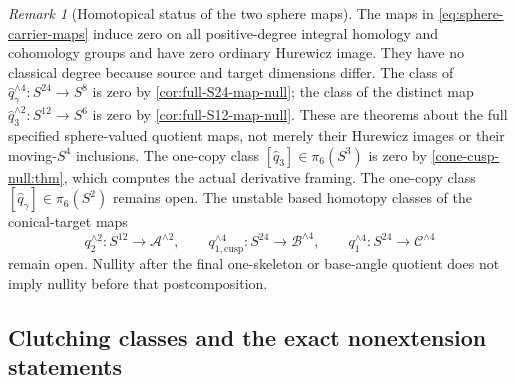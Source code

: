 \documentclass[11pt,letterpaper]{article}
\numberwithin{equation}{section}
\theoremstyle{definition}
\theoremstyle{remark}
\newtheorem{remark}[theorem]{Remark}
\begin{document}
\begin{remark}[Homotopical status of the two sphere maps]
\label{rem:sphere-map-homotopy}
The maps in \cref{eq:sphere-carrier-maps} induce zero on all
positive-degree integral homology and cohomology groups and have zero
ordinary Hurewicz image.  They have no classical degree because source
and target dimensions differ.  The class of
\(\widehat q_\gamma^{\wedge4}:S^{24}\to S^8\) is zero by
\cref{cor:full-S24-map-null}; the class of the distinct map
\(\widehat q_3^{\wedge2}:S^{12}\to S^6\) is zero by
\cref{cor:full-S12-map-null}.  These are theorems about the full specified
sphere-valued quotient maps, not merely their Hurewicz images or their
moving-\(S^4\) inclusions. The one-copy class
\([\widehat q_3]\in\pi_6(S^3)\) is zero by
\cref{cone-cusp-null:thm}, which computes the actual derivative framing.
The one-copy class \([\widehat q_\gamma]\in\pi_6(S^2)\) remains open.
The unstable based homotopy classes of the
conical-target maps
\[
 q_2^{\wedge2}:S^{12}\to\mathcal A^{\wedge2},\qquad
 q_{1,\mathrm{cusp}}^{\wedge4}:S^{24}\to\mathcal B^{\wedge4},\qquad
 q_1^{\wedge4}:S^{24}\to\mathcal C^{\wedge4}
\]
remain open.  Nullity after the final one-skeleton or base-angle quotient
does not imply nullity before that postcomposition.
\end{remark}

\subsection{Clutching classes and the exact nonextension statements}
\end{document}
